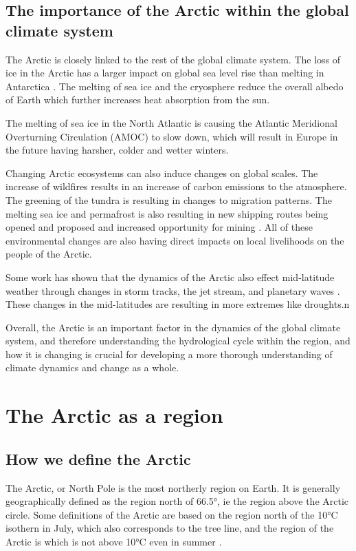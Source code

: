 \documentclass[12pt, oneside]{article}
\begin{document}
\subsection{The importance of the Arctic within the global climate system}
The Arctic is closely linked to the rest of the global climate system. The loss of ice in the Arctic has a larger impact on global sea level rise than melting in Antarctica \cite{AMAP}. The melting of sea ice and the cryosphere reduce the overall albedo of Earth which further increases heat absorption from the sun.

The melting of sea ice in the North Atlantic is causing the Atlantic Meridional Overturning Circulation (AMOC) to slow down, which will result in Europe in the future having harsher, colder and wetter winters. 

Changing Arctic ecosystems can also induce changes on global scales. The increase of wildfires results in an increase of carbon emissions to the atmosphere. The greening of the tundra is resulting in changes to migration patterns. The melting sea ice and permafrost is also resulting in new shipping routes being opened and proposed and increased opportunity for mining \cite{AMAP}. All of these environmental changes are also having direct impacts on local livelihoods on the people of the Arctic.  

Some work has shown that the dynamics of the Arctic also effect mid-latitude weather through changes in storm tracks, the jet stream, and planetary waves \cite{cohen2014recent}. These changes in the mid-latitudes are resulting in more extremes like droughts.n

Overall, the Arctic is an important factor in the dynamics of the global climate system, and therefore understanding the hydrological cycle within the region, and how it is changing is crucial for developing a more thorough understanding of climate dynamics and change as a whole.

\section{The Arctic as a region}
\subsection{How we define the Arctic}
The Arctic, or North Pole is the most northerly region on Earth. It is generally geographically defined as the region north of 66.5°, ie the region above the Arctic circle. Some definitions of the Arctic are based on the region north of the 10°C isothern in July, which also corresponds to the tree line, and the region of the Arctic is which is not above 10°C even in summer \cite{boulder}.  
\end{document}
